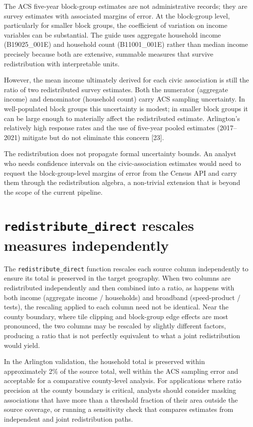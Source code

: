 \documentclass[
  letterpaper,
  DIV=11,
  numbers=noendperiod]{scrreprt}
\begin{document}
The ACS five-year block-group estimates are not administrative records;
they are survey estimates with associated margins of error. At the
block-group level, particularly for smaller block groups, the
coefficient of variation on income variables can be substantial. The
guide uses aggregate household income (B19025\_001E) and household count
(B11001\_001E) rather than median income precisely because both are
extensive, summable measures that survive redistribution with
interpretable units.

However, the mean income ultimately derived for each civic association
is still the ratio of two redistributed survey estimates. Both the
numerator (aggregate income) and denominator (household count) carry ACS
sampling uncertainty. In well-populated block groups this uncertainty is
modest; in smaller block groups it can be large enough to materially
affect the redistributed estimate. Arlington's relatively high response
rates and the use of five-year pooled estimates (2017--2021) mitigate
but do not eliminate this concern {[}23{]}.

The redistribution does not propagate formal uncertainty bounds. An
analyst who needs confidence intervals on the civic-association
estimates would need to request the block-group-level margins of error
from the Census API and carry them through the redistribution algebra, a
non-trivial extension that is beyond the scope of the current pipeline.

\section{\texorpdfstring{\texttt{redistribute\_direct} rescales measures
independently}{redistribute\_direct rescales measures independently}}\label{redistribute_direct-rescales-measures-independently}

The \texttt{redistribute\_direct} function rescales each source column
independently to ensure its total is preserved in the target geography.
When two columns are redistributed independently and then combined into
a ratio, as happens with both income (aggregate income / households) and
broadband (speed-product / tests), the rescaling applied to each column
need not be identical. Near the county boundary, where tile clipping and
block-group edge effects are most pronounced, the two columns may be
rescaled by slightly different factors, producing a ratio that is not
perfectly equivalent to what a joint redistribution would yield.

In the Arlington validation, the household total is preserved within
approximately 2\% of the source total, well within the ACS sampling
error and acceptable for a comparative county-level analysis. For
applications where ratio precision at the county boundary is critical,
analysts should consider masking associations that have more than a
threshold fraction of their area outside the source coverage, or running
a sensitivity check that compares estimates from independent and joint
redistribution paths.
\end{document}
